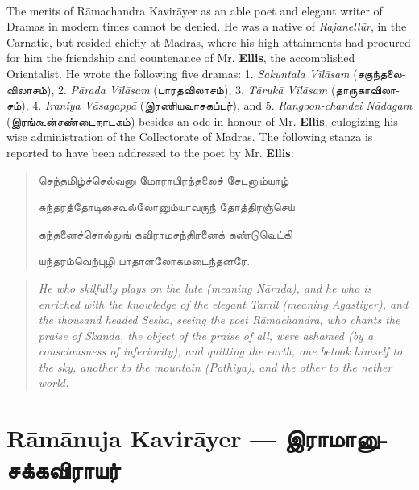\documentclass{article}
\newcommand{\TamilText}[1]{\texttamil{#1}}
\newcommand{\TamilBold}[1]{\texttamil{\textbf{#1}}}
\newcommand{\tam}[1]{\TamilText{#1}}
\newcommand{\tambold}[1]{\TamilBold{#1}}
\begin{document}
\paragraph{}
The merits of R\={a}machandra Kavir\={a}yer as an able poet and elegant writer of Dramas in modern times cannot be denied. He was a native of \emph{Rajanell\={u}r}, in the Carnatic, but resided chiefly at Madras, where his high attainments had procured for him the friendship and countenance of Mr. \textbf{Ellis}, the accomplished Orientalist. He wrote the following five dramas: 1. \emph{Sakuntala V\={i}l\={a}sam} (\tam{சகுந்தலைவிலாசம்}), 2. \emph{P\={a}rada V\={i}l\={a}sam} (\tam{பாரதவிலாசம்}), 3. \emph{T\={a}ruk\={a} V\={i}l\={a}sam} (\tam{தாருகாவிலாசம்}), 4. \emph{Iraniya V\={a}sagapp\={a}} (\tam{இரணியவாசகப்பர்}), and 5. \emph{Rangoon-chandei N\={a}dagam} (\tam{இரங்கூன்சண்டைநாடகம்}) besides an ode in honour of Mr. \textbf{Ellis}, eulogizing his wise administration of the Collectorate of Madras. The following stanza is reported to have been addressed to the poet by Mr. \textbf{Ellis}:
\begin{quotation}\small
\tam{செந்தமிழ்ச்செல்வனு மோராயிரந்தலைச்‌ சேடனும்யாழ்‌}

\tam{சுந்தரத்தோடிசைவல்லோனும்யாவருந் தோத்திரஞ்செய்‌}

\tam{கந்தனைச்சொல்லுங்‌ கவிராமசந்திரனைக்‌ கண்டுவெட்கி}

\tam{யந்தரம்வெற்புழி பாதாளலோகமடைந்தனரே}.
\end{quotation}
\begin{quotation}\small
\emph{He who skilfully plays on the lute (meaning N\={a}rada), and he who is enriched with the knowledge of the elegant Tamil (meaning Agastiyer), and the thousand headed Sesha, seeing the poet R\={a}machandra, who chants the praise of Skanda, the object of the praise of all, were ashamed (by a consciousness of inferiority), and quitting the earth, one betook himself to the sky, another to the mountain (Pothiya), and the other to the nether world.}
\end{quotation}

\section{R\={a}m\={a}nuja Kavir\={a}yer --- \tambold{இராமானுசக்கவிராயர்}}
\end{document}
